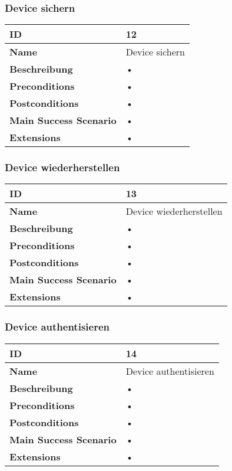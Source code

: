 \subsubsection{Device sichern}
\mbox{}
\begin{longtable}{| p{4cm} | p{11.7cm} |}
 \hline
 \textbf{ID} & 12\\ \hline 
 \textbf{Name} & Device sichern\\ \hline 
 \textbf{Beschreibung} & • \\ \hline 
 \textbf{Preconditions} & • \\ \hline 
 \textbf{Postconditions} & • \\ \hline 
 \textbf{Main Success Scenario} & • \\ \hline 
 \textbf{Extensions} & • \\ \hline 
 \end{longtable}
 
\subsubsection{Device wiederherstellen}
\mbox{}
\begin{longtable}{| p{4cm} | p{11.7cm} |}
 \hline
 \textbf{ID} & 13\\ \hline 
 \textbf{Name} & Device wiederherstellen\\ \hline 
 \textbf{Beschreibung} & • \\ \hline 
 \textbf{Preconditions} & • \\ \hline 
 \textbf{Postconditions} & • \\ \hline 
 \textbf{Main Success Scenario} & • \\ \hline 
 \textbf{Extensions} & • \\ \hline 
 \end{longtable}
 
\subsubsection{Device authentisieren}
\mbox{}
\begin{longtable}{| p{4cm} | p{11.7cm} |}
 \hline
 \textbf{ID} & 14\\ \hline 
 \textbf{Name} & Device authentisieren\\ \hline 
 \textbf{Beschreibung} & • \\ \hline 
 \textbf{Preconditions} & • \\ \hline 
 \textbf{Postconditions} & • \\ \hline 
 \textbf{Main Success Scenario} & • \\ \hline 
 \textbf{Extensions} & • \\ \hline 
 \end{longtable}
 
